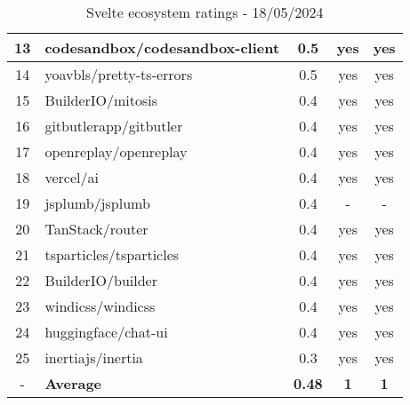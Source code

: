 \begin{table}[H]
{\begin{tabular}{|c|l|c|c|c|}
            13 & codesandbox/codesandbox-client & 0.5                & yes                        & yes                \\ \hline
            14 & yoavbls/pretty-ts-errors       & 0.5                & yes                        & yes                \\ \hline
            15 & BuilderIO/mitosis              & 0.4                & yes                        & yes                \\ \hline
            16 & gitbutlerapp/gitbutler         & 0.4                & yes                        & yes                \\ \hline
            17 & openreplay/openreplay          & 0.4                & yes                        & yes                \\ \hline
            18 & vercel/ai                      & 0.4                & yes                        & yes                \\ \hline
            19 & jsplumb/jsplumb                & 0.4                & -                          & -                  \\ \hline
            20 & TanStack/router                & 0.4                & yes                        & yes                \\ \hline
            21 & tsparticles/tsparticles        & 0.4                & yes                        & yes                \\ \hline
            22 & BuilderIO/builder              & 0.4                & yes                        & yes                \\ \hline
            23 & windicss/windicss              & 0.4                & yes                        & yes                \\ \hline
            24 & huggingface/chat-ui            & 0.4                & yes                        & yes                \\ \hline
            25 & inertiajs/inertia              & 0.3                & yes                        & yes                \\ \hline
            -  & \textbf{Average}               & \textbf{0.48}      & \textbf{1}                 & \textbf{1}         \\ \hline
        \end{tabular}
    }
    \caption{Svelte ecosystem ratings - 18/05/2024}
    \label{tab:metrics:svelte:ratings}
\end{table}


